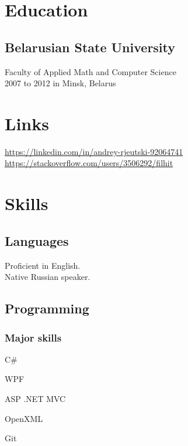 \documentclass[a4paper,11pt]{article}
\newcommand{\minsk}{Minsk, Belarus}
\newcommand{\periodinminsk}[1]{{\footnotesize #1 in \minsk}}
\begin{document}
  \vspace{0.5cm}
  \begin{minipage}[t]{0.34\textwidth}
    \section*{Education} 
    \subsection*{Belarusian State University}
    Faculty of Applied Math and Computer Science\\
    \periodinminsk{2007 to 2012}
    \section*{Links} 
    \href{https://linkedin.com/in/andrey-rjeutski-92064741}{https://linkedin.com/in/andrey-rjeutski-92064741}\\
    \href{https://stackoverflow.com/users/3506292/filhit}{https://stackoverflow.com/\allowbreak users/3506292/filhit}
    \section*{Skills}
    \subsection*{Languages}
    Proficient in English.\\
    Native Russian speaker.
    \subsection*{Programming}
    \subsubsection*{Major skills}
    \begin{inparaitem}
      \item C\# 
      \item WPF
      \item ASP .NET MVC
      \item OpenXML
      \item Git
    \end{inparaitem}

\end{minipage}
\end{document}
